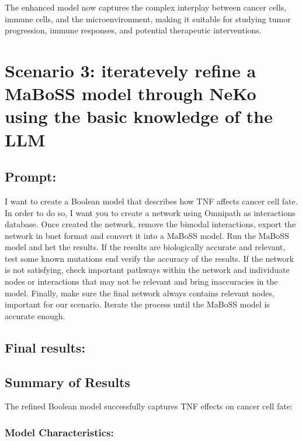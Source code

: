 The enhanced model now captures the complex interplay between cancer
cells, immune cells, and the microenvironment, making it suitable for
studying tumor progression, immune responses, and potential therapeutic
interventions.

\hypertarget{scenario-3-iteratevely-refine-a-maboss-model-through-neko-using-the-basic-knowledge-of-the-llm}{%
\section{Scenario 3: iteratevely refine a MaBoSS model through NeKo
using the basic knowledge of the
LLM}\label{scenario-3-iteratevely-refine-a-maboss-model-through-neko-using-the-basic-knowledge-of-the-llm}}

\hypertarget{prompt-2}{%
\subsection{Prompt:}\label{prompt-2}}

I want to create a Boolean model that describes how TNF affects cancer
cell fate. In order to do so, I want you to create a network using
Omnipath as interactions database. Once created the network, remove the
bimodal interactions, export the network in bnet format and convert it
into a MaBoSS model. Run the MaBoSS model and het the results. If the
results are biologically accurate and relevant, test some known
mutations end verify the accuracy of the results. If the network is not
satisfying, check important pathways within the network and individuate
nodes or interactions that may not be relevant and bring inaccuracies in
the model. Finally, make sure the final network always contains relevant
nodes, important for our scenario. Iterate the process until the MaBoSS
model is accurate enough.

\hypertarget{final-results-2}{%
\subsection{Final results:}\label{final-results-2}}

\hypertarget{summary-of-results}{%
\subsection{Summary of Results}\label{summary-of-results}}

The refined Boolean model successfully captures TNF effects on cancer
cell fate:

\hypertarget{model-characteristics}{%
\subsubsection{\texorpdfstring{\textbf{Model
Characteristics:}}{Model Characteristics:}}\label{model-characteristics}}

